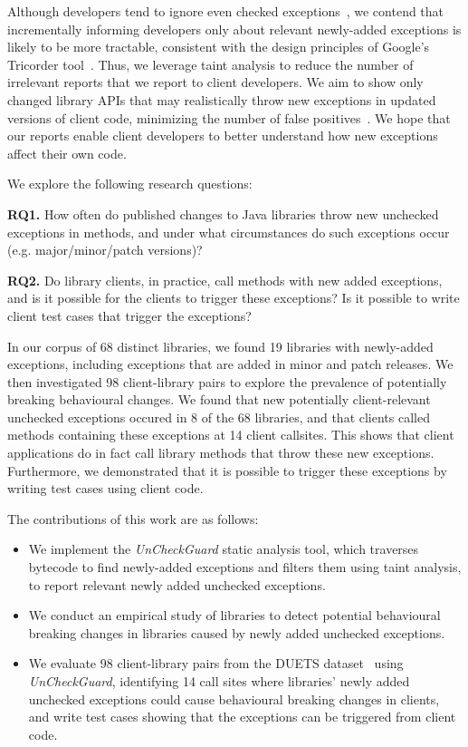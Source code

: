 Although developers tend to ignore even checked
exceptions~\cite{nakshatri16:_analy_java}, we contend that incrementally informing
developers only about relevant newly-added exceptions is likely to be more tractable, consistent with the
design principles of Google's Tricorder tool~\cite{sadowski15:_tricor}.
Thus, we leverage taint analysis
to reduce the number of irrelevant reports that we report to client developers.
We aim to show only changed library APIs that may realistically throw new exceptions
in updated versions of client code, minimizing the number of false positives~\cite{pashchenko20:_vuln4,pashchenko18:_vulner}.
We hope that our reports enable client developers to better understand how new exceptions affect their own code.

We explore the following research questions:

\noindent
{\bf RQ1.} How often do published changes to Java libraries throw new unchecked exceptions in methods,
and under what circumstances do such exceptions occur (e.g. major/minor/patch versions)?

\noindent
{\bf RQ2.} Do library clients, in practice, call methods with new added exceptions, and is it possible for the clients to trigger these exceptions? Is it possible to write client test cases that trigger the exceptions?

In our corpus of 68 distinct libraries, we found 19 libraries with newly-added exceptions, including exceptions that are added in minor and patch releases.
We then investigated 98 client-library pairs to explore the prevalence of potentially breaking behavioural changes.
We found that new potentially client-relevant unchecked exceptions occured in 8 of the 68 libraries, and that clients called methods containing these exceptions at 14 client callsites.
This shows that client applications do in fact call library methods that throw these new exceptions.
Furthermore, we demonstrated that it is possible to trigger these exceptions by writing test cases using client code.

The contributions of this work are as follows:

\begin{itemize}[noitemsep]
\item We implement the \textit{UnCheckGuard} static analysis tool, which traverses bytecode to find newly-added exceptions and filters them using taint analysis, to report relevant newly added unchecked exceptions.
\item We conduct an empirical study of libraries to detect potential behavioural breaking changes in libraries caused by newly added unchecked exceptions.
\item We evaluate 98 client-library pairs from the DUETS dataset~\cite{durieux21:_duets} using \textit{UnCheckGuard}, identifying 14 call sites where libraries' newly added unchecked exceptions could cause behavioural breaking changes in clients, and write test cases showing that the exceptions can be triggered from client code.
\end{itemize}


